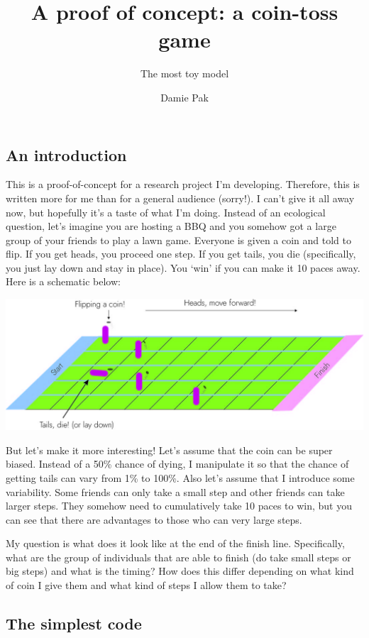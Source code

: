 \documentclass[
]{article}
\title{A proof of concept: a coin-toss game}
\subtitle{The most toy model}
\author{Damie Pak}
\date{}
\begin{document}
\maketitle

{
\setcounter{tocdepth}{3}
\tableofcontents
}
\subsection{An introduction}\label{an-introduction}

This is a proof-of-concept for a research project I'm developing.
Therefore, this is written more for me than for a general audience
(sorry!). I can't give it all away now, but hopefully it's a taste of
what I'm doing. Instead of an ecological question, let's imagine you are
hosting a BBQ and you somehow got a large group of your friends to play
a lawn game. Everyone is given a coin and told to flip. If you get
heads, you proceed one step. If you get tails, you die (specifically,
you just lay down and stay in place). You `win' if you can make it 10
paces away. Here is a schematic below:

\includegraphics{coin_flipping_schematicpdf.jpg}

But let's make it more interesting! Let's assume that the coin can be
super biased. Instead of a 50\% chance of dying, I manipulate it so that
the chance of getting tails can vary from 1\% to 100\%. Also let's
assume that I introduce some variability. Some friends can only take a
small step and other friends can take larger steps. They somehow need to
cumulatively take 10 paces to win, but you can see that there are
advantages to those who can very large steps.

My question is what does it look like at the end of the finish line.
Specifically, what are the group of individuals that are able to finish
(do take small steps or big steps) and what is the timing? How does this
differ depending on what kind of coin I give them and what kind of steps
I allow them to take?

\subsection{The simplest code}\label{the-simplest-code}
\end{document}

